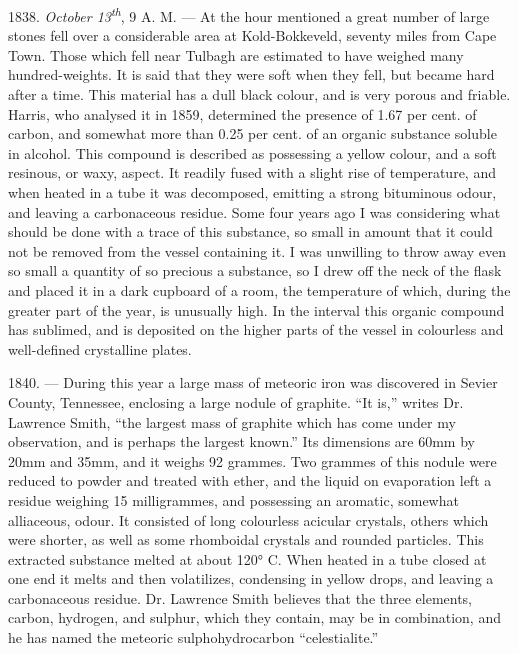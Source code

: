 \documentclass[a4paper, 11pt, oneside, english]{article}
\begin{document}
1838. \emph{October 13\textsuperscript{th}}, 9 A. M. --- At the hour mentioned a great number of large stones fell over a considerable area at Kold-Bokkeveld, seventy miles from Cape Town. Those which fell near Tulbagh are estimated to have weighed many hundred-weights. It is said that they were soft when they fell, but became hard after a time. This material has a dull black colour, and is very porous and friable. Harris, who analysed it in 1859, determined the presence of 1.67 per cent. of carbon, and somewhat more than 0.25 per cent. of an organic substance soluble in alcohol. This compound is described as possessing a yellow colour, and a soft resinous, or waxy, aspect. It readily fused with a slight rise of temperature, and when heated in a tube it was decomposed, emitting a strong bituminous odour, and leaving a carbonaceous residue. Some four years ago I was considering what should be done with a trace of this substance, so small in amount that it could not be removed from the vessel containing it. I was unwilling to throw away even so small a quantity of so precious a substance, so I drew off the neck of the flask and placed it in a dark cupboard of a room, the temperature of which, during the greater part of the year, is unusually high. In the interval this organic compound has sublimed, and is deposited on the higher parts of the vessel in colourless and well-defined crystalline plates.

1840. --- During this year a large mass of meteoric iron was discovered in Sevier County, Tennessee, enclosing a large nodule of graphite. ``It is,'' writes Dr. Lawrence Smith, ``the largest mass of graphite which has come under my observation, and is perhaps the largest known.'' Its dimensions are 60mm by 20mm and 35mm, and it weighs 92 grammes. Two grammes of this nodule were reduced to powder and treated with ether, and the liquid on evaporation left a residue weighing 15 milligrammes, and possessing an aromatic, somewhat alliaceous, odour. It consisted of long colourless acicular crystals, others which were shorter, as well as some rhomboidal crystals and rounded particles. This extracted substance melted at about 120° C. When heated in a tube closed at one end it melts and then volatilizes, condensing in yellow drops, and leaving a carbonaceous residue. Dr. Lawrence Smith believes that the three elements, carbon, hydrogen, and sulphur, which they contain, may be in combination, and he has named the meteoric sulphohydrocarbon ``celestialite.''
\end{document}
